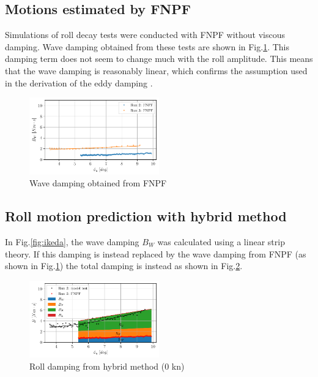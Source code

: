     \subsection*{Motions estimated by FNPF}\label{motions-estimated-by-fnpf}

Simulations of roll decay tests were conducted with FNPF without viscous
damping. Wave damping obtained from these tests are shown in
Fig.\ref{fig:fnpf}. This damping term does not seem to change
much with the roll amplitude. This means that the wave damping is
reasonably linear, which confirms the assumption used in the derivation
of the eddy damping \citep{7505983/4AFVVGNT}.

    

    \begin{figure}[H]
        \begin{center}\includegraphics[width = 0.5\textwidth]{figures/fnpf.pdf}\end{center}
        \vspace{-1cm}
        \caption{Wave damping obtained from FNPF}
        \label{fig:fnpf}
    \end{figure}
    
    \subsection*{Roll motion prediction with hybrid
method}\label{roll-motion-prediction-with-hybrid-method}

    In Fig.\ref{fig:ikeda}, the wave damping $B_W$ was calculated
using a linear strip theory. If this damping is instead replaced by the
wave damping from FNPF (as shown in Fig.\ref{fig:fnpf}) the
total damping is instead as shown in Fig.\ref{fig:hybrid_0}.

    

    \begin{figure}[H]
        \begin{center}\includegraphics[width = 0.5\textwidth]{figures/hybrid_0.pdf}\end{center}
        \vspace{-1cm}
        \caption{Roll damping from hybrid method (0 kn)}
        \label{fig:hybrid_0}
    \end{figure}
    
